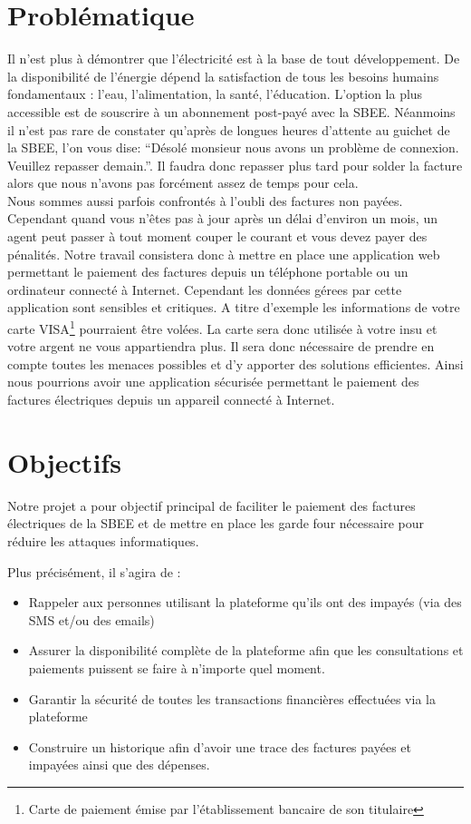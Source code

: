     \section{Problématique}
    \small{
	Il n'est plus \`a d\'emontrer que l'\'electricit\'e est \`a la base de tout d\'eveloppement. De la disponibilité de l’énergie dépend la satisfaction de tous les besoins humains fondamentaux : l’eau, l’alimentation, la santé, l’éducation. L'option la plus accessible est de souscrire \`a un abonnement post-pay\'e avec la SBEE.
	N\'eanmoins il n'est pas rare de constater qu'apr\`es de longues heures d'attente au guichet de la SBEE, l'on vous dise: ``D\'esol\'e monsieur nous avons un probl\`eme de connexion. Veuillez repasser demain.''. Il faudra donc repasser plus tard pour solder la facture alors que nous n'avons pas forc\'ement assez de temps pour cela. \\
	Nous sommes aussi parfois confront\'es \`a l'oubli des factures non pay\'ees. Cependant quand vous n'\^etes pas \`a jour apr\`es un d\'elai d'environ un mois, un agent peut passer \`a tout moment couper le courant et vous devez payer des p\'enalit\'es. Notre travail consistera donc \`a mettre en place une application web permettant le paiement des factures depuis un t\'el\'ephone portable ou un ordinateur connect\'e \`a Internet. Cependant les donn\'ees g\'erees par cette application sont sensibles et critiques. A titre d'exemple les informations de votre carte VISA\footnote{Carte de paiement émise par l'établissement bancaire de son titulaire} pourraient \^etre vol\'ees. La carte sera donc utilis\'ee \`a votre insu et votre argent ne vous appartiendra plus. Il sera donc nécessaire de prendre en compte toutes les menaces possibles et d'y apporter des solutions efficientes. Ainsi nous pourrions avoir une application s\'ecuris\'ee permettant le paiement des factures \'electriques depuis un appareil connect\'e \`a Internet.
	}

    \section{Objectifs}
    \small{ 
	  Notre projet a pour objectif principal de faciliter le paiement des factures \'electriques de la SBEE et de mettre en place les garde four nécessaire pour réduire les attaques informatiques.
	        
	  Plus précisément, il s'agira de :
	
    \begin{itemize}
	\item Rappeler aux personnes utilisant la plateforme qu'ils ont des impay\'es (via des SMS et/ou des emails)
        \item Assurer la disponibilit\'e compl\`ete de la plateforme afin que les consultations et paiements puissent se faire \`a n'importe quel moment.
	\item Garantir la s\'ecurit\'e de toutes les transactions financi\`eres effectu\'ees via la plateforme
	\item Construire un historique afin d'avoir une trace des factures pay\'ees et impay\'ees ainsi que des d\'epenses.
    \end{itemize}
    }


